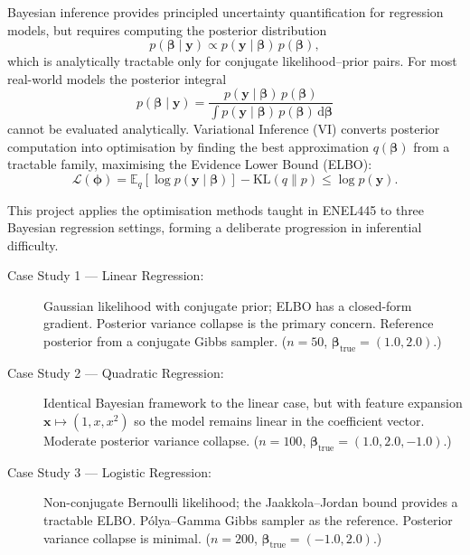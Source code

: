 \documentclass[11pt,a4paper]{article}
\newcommand{\E}{\mathbb{E}}
\begin{document}
Bayesian inference provides principled uncertainty quantification for regression models,
but requires computing the posterior distribution
\begin{equation*}
  p(\bm{\beta} \mid \bm{y}) \propto p(\bm{y} \mid \bm{\beta})\,p(\bm{\beta}),
\end{equation*}
which is analytically tractable only for conjugate likelihood--prior pairs.
For most real-world models the posterior integral
\begin{equation*}
  p(\bm{\beta} \mid \bm{y})
  = \frac{p(\bm{y} \mid \bm{\beta})\,p(\bm{\beta})}
         {\displaystyle\int p(\bm{y} \mid \bm{\beta})\,p(\bm{\beta})\, \mathrm{d}\bm{\beta}}
\end{equation*}
cannot be evaluated analytically.
Variational Inference (VI) converts posterior computation into optimisation by finding
the best approximation $q(\bm{\beta})$ from a tractable family, maximising the
Evidence Lower Bound (ELBO):
\begin{equation*}
  \mathcal{L}(\bm{\phi})
  = \E_{q}[\log p(\bm{y}\mid\bm{\beta})]
  - \mathrm{KL}(q \| p)
  \leq \log p(\bm{y}).
\end{equation*}

This project applies the optimisation methods taught in ENEL445 to three Bayesian
regression settings, forming a deliberate progression in inferential difficulty.

\begin{description}
  \item[Case Study 1 --- Linear Regression:]
    Gaussian likelihood with conjugate prior; ELBO has a closed-form gradient.
    Posterior variance collapse is the primary concern.
    Reference posterior from a conjugate Gibbs sampler.
    ($n=50$, $\bm{\beta}_{\mathrm{true}} = (1.0, 2.0)$.)
  \item[Case Study 2 --- Quadratic Regression:]
    Identical Bayesian framework to the linear case, but with feature expansion
    $\bm{x} \mapsto (1, x, x^2)$ so the model remains linear in the coefficient vector.
    Moderate posterior variance collapse.
    ($n=100$, $\bm{\beta}_{\mathrm{true}} = (1.0, 2.0, -1.0)$.)
  \item[Case Study 3 --- Logistic Regression:]
    Non-conjugate Bernoulli likelihood; the Jaakkola--Jordan bound provides a tractable
    ELBO.
    P\'{o}lya--Gamma Gibbs sampler as the reference.
    Posterior variance collapse is minimal.
    ($n=200$, $\bm{\beta}_{\mathrm{true}} = (-1.0, 2.0)$.)
\end{description}
\end{document}
